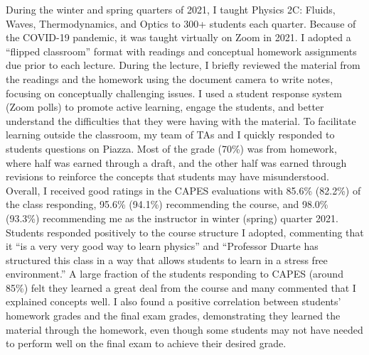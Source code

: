 \documentclass[11pt,letterpaper,notitlepage]{article}
\begin{document}
During the winter and spring quarters of 2021, I taught Physics 2C: Fluids, Waves, Thermodynamics, and Optics to 300+ students each quarter.
Because of the COVID-19 pandemic, it was taught virtually on Zoom in 2021.
I adopted a ``flipped classroom'' format with readings and conceptual homework assignments due prior to each lecture.
During the lecture, I briefly reviewed the material from the readings and the homework using the document camera to write notes, focusing on conceptually challenging issues.
I used a student response system (Zoom polls) to promote active learning, engage the students, and better understand the difficulties that they were having with the material.
To facilitate learning outside the classroom, my team of TAs and I quickly responded to students questions on Piazza.
Most of the grade (70\%) was from homework, where half was earned through a draft, and the other half was earned through revisions to reinforce the concepts that students may have misunderstood.
Overall, I received good ratings in the CAPES evaluations with 85.6\% (82.2\%) of the class responding, 95.6\% (94.1\%) recommending the course, and 98.0\% (93.3\%) recommending me as the instructor in winter (spring) quarter 2021.
Students responded positively to the course structure I adopted, commenting that it ``is a very very good way to learn physics'' and ``Professor Duarte has structured this class in a way that allows students to learn in a stress free environment.''
A large fraction of the students responding to CAPES (around 85\%) felt they learned a great deal from the course and many commented that I explained concepts well.
I also found a positive correlation between students' homework grades and the final exam grades, demonstrating they learned the material through the homework, even though some students may not have needed to perform well on the final exam to achieve their desired grade.
\end{document}
